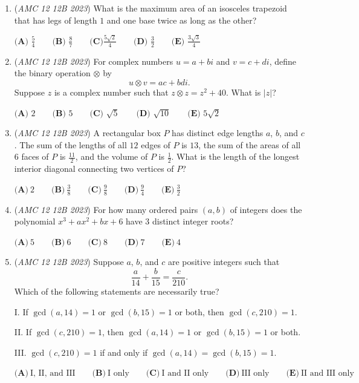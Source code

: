 \begin{enumerate}
	\item (\textit{AMC 12 12B 2023}) What is the maximum area of an isosceles trapezoid that has legs of length $1$ and one base twice as long as the other?


 $\textbf{(A) }\frac 54 \qquad \textbf{(B) } \frac 87 \qquad \textbf{(C)} \frac{5\sqrt2}4 \qquad \textbf{(D) } \frac 32  \qquad \textbf{(E) } \frac{3\sqrt3}4$


	\item (\textit{AMC 12 12B 2023}) For complex numbers $u=a+bi$ and $v=c+di$, define the binary operation $\otimes$ by
 \[u\otimes v=ac+bdi.\]Suppose $z$ is a complex number such that $z\otimes z=z^{2}+40$. What is $|z|$?


 $\textbf{(A) }2\qquad\textbf{(B) }5\qquad\textbf{(C) }\sqrt{5}\qquad\textbf{(D) }\sqrt{10}\qquad\textbf{(E) }5\sqrt{2}$


	\item (\textit{AMC 12 12B 2023}) A rectangular box $P$ has distinct edge lengths $a$, $b$, and $c$. The sum of the lengths of all $12$ edges of $P$ is $13$, the sum of the areas of all $6$ faces of $P$ is $\frac{11}{2}$, and the volume of $P$ is $\frac{1}{2}$. What is the length of the longest interior diagonal connecting two vertices of $P$?


 $\textbf{(A)}~2\qquad\textbf{(B)}~\frac{3}{8}\qquad\textbf{(C)}~\frac{9}{8}\qquad\textbf{(D)}~\frac{9}{4}\qquad\textbf{(E)}~\frac{3}{2}$


	\item (\textit{AMC 12 12B 2023}) For how many ordered pairs $(a,b)$ of integers does the polynomial $x^3+ax^2+bx+6$ have $3$ distinct integer roots?


 $\textbf{(A)}\ 5 \qquad\textbf{(B)}\ 6 \qquad\textbf{(C)}\ 8 \qquad\textbf{(D)}\ 7 \qquad\textbf{(E)}\ 4$


	\item (\textit{AMC 12 12B 2023}) Suppose $a$, $b$, and $c$ are positive integers such that
 \[\frac{a}{14}+\frac{b}{15}=\frac{c}{210}.\]Which of the following statements are necessarily true?


 I. If $\gcd(a,14)=1$ or $\gcd(b,15)=1$ or both, then $\gcd(c,210)=1$.


 II. If $\gcd(c,210)=1$, then $\gcd(a,14)=1$ or $\gcd(b,15)=1$ or both.


 III. $\gcd(c,210)=1$ if and only if $\gcd(a,14)=\gcd(b,15)=1$.


 $\textbf{(A)}~\text{I, II, and III}\qquad\textbf{(B)}~\text{I only}\qquad\textbf{(C)}~\text{I and II only}\qquad\textbf{(D)}~\text{III only}\qquad\textbf{(E)}~\text{II and III only}$



\end{enumerate}
